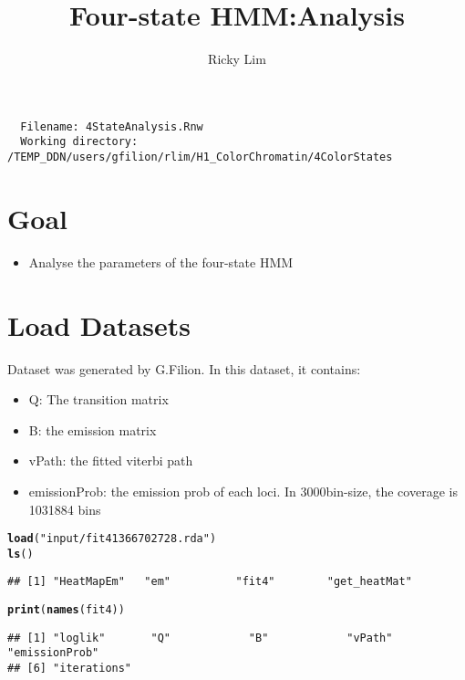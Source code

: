 \documentclass{article}\usepackage{graphicx, color}
\makeatletter
\newcommand{\hlfunctioncall}[1]{\textcolor[rgb]{0.501960784313725,0,0.329411764705882}{\textbf{#1}}}%
\newcommand{\hlstring}[1]{\textcolor[rgb]{0.6,0.6,1}{#1}}%
\newenvironment{kframe}{%
 \def\at@end@of@kframe{}%
 \ifinner\ifhmode%
  \def\at@end@of@kframe{\end{minipage}}%
  \begin{minipage}{\columnwidth}%
 \fi\fi%
 \def\FrameCommand##1{\hskip\@totalleftmargin \hskip-\fboxsep
 \colorbox{shadecolor}{##1}\hskip-\fboxsep
     \hskip-\linewidth \hskip-\@totalleftmargin \hskip\columnwidth}%
 \MakeFramed {\advance\hsize-\width
   \@totalleftmargin\z@ \linewidth\hsize
   \@setminipage}}%
 {\par\unskip\endMakeFramed%
 \at@end@of@kframe}
\newenvironment{knitrout}{}{} %
\makeatother
\begin{document}
\author{Ricky Lim}
\title{Four-state HMM:Analysis}
\maketitle

\begin{verbatim}
  Filename: 4StateAnalysis.Rnw 
  Working directory: /TEMP_DDN/users/gfilion/rlim/H1_ColorChromatin/4ColorStates 
\end{verbatim}

\section{Goal}
\begin{itemize}
  \item Analyse the parameters of the four-state HMM
\end{itemize}

\section{Load Datasets}
Dataset was generated by G.Filion. In this dataset, it contains:\\
\begin{itemize}                                                                                    
  \item Q: The transition matrix
  \item B: the emission matrix
  \item vPath: the fitted viterbi path
  \item emissionProb: the emission prob of each loci. In 3000bin-size, the coverage is 1031884 bins
\end{itemize}

\begin{knitrout}
\color{fgcolor}\begin{kframe}
\begin{alltt}
\hlfunctioncall{load}(\hlstring{"input/fit41366702728.rda"})
\hlfunctioncall{ls}()
\end{alltt}
\begin{verbatim}
## [1] "HeatMapEm"   "em"          "fit4"        "get_heatMat"
\end{verbatim}
\begin{alltt}
\hlfunctioncall{print}(\hlfunctioncall{names}(fit4))
\end{alltt}
\begin{verbatim}
## [1] "loglik"       "Q"            "B"            "vPath"        "emissionProb"
## [6] "iterations"
\end{verbatim}
\end{kframe}
\end{knitrout}
\end{document}
